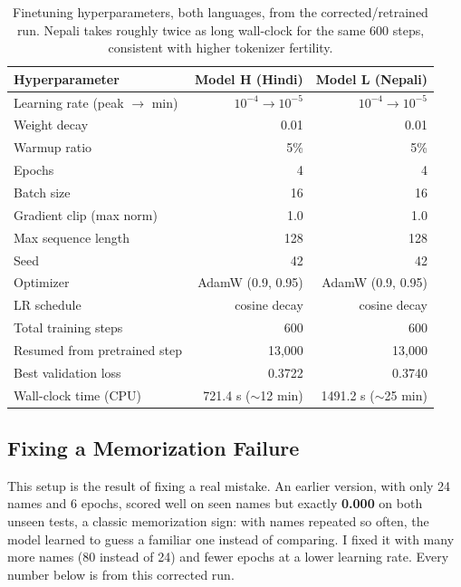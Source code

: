 \documentclass[11pt]{article}
\begin{document}
\begin{table}[h]
\centering\small
\begin{tabular}{lrr}
\toprule
\textbf{Hyperparameter} & \textbf{Model H (Hindi)} & \textbf{Model L (Nepali)} \\
\midrule
Learning rate (peak $\to$ min) & $10^{-4} \to 10^{-5}$ & $10^{-4} \to 10^{-5}$ \\
Weight decay & 0.01 & 0.01 \\
Warmup ratio & 5\% & 5\% \\
Epochs & 4 & 4 \\
Batch size & 16 & 16 \\
Gradient clip (max norm) & 1.0 & 1.0 \\
Max sequence length & 128 & 128 \\
Seed & 42 & 42 \\
Optimizer & AdamW (0.9, 0.95) & AdamW (0.9, 0.95) \\
LR schedule & cosine decay & cosine decay \\
Total training steps & 600 & 600 \\
Resumed from pretrained step & 13,000 & 13,000 \\
Best validation loss & 0.3722 & 0.3740 \\
Wall-clock time (CPU) & 721.4 s ($\sim$12 min) & 1491.2 s ($\sim$25 min) \\
\bottomrule
\end{tabular}
\caption{Finetuning hyperparameters, both languages, from the corrected/retrained run. Nepali takes roughly twice as long wall-clock for the same 600 steps, consistent with higher tokenizer fertility.}
\end{table}

\subsection{Fixing a Memorization Failure}

This setup is the result of fixing a real mistake. An earlier version, with only 24 names and 6 epochs, scored well on seen names but exactly \textbf{0.000} on both unseen tests, a classic memorization sign: with names repeated so often, the model learned to guess a familiar one instead of comparing. I fixed it with many more names (80 instead of 24) and fewer epochs at a lower learning rate. Every number below is from this corrected run.
\end{document}

